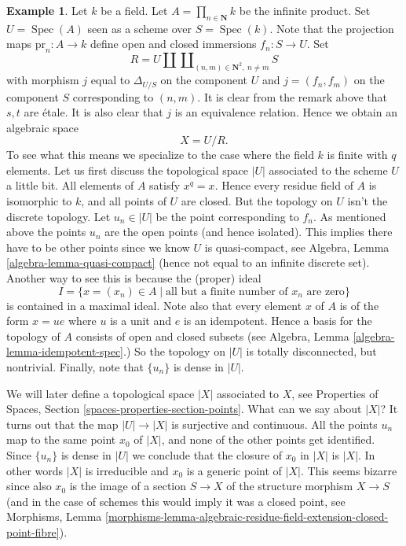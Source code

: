 \documentclass{stacks-project}
\theoremstyle{plain}
\theoremstyle{definition}
\newtheorem{example}[subsection]{Example}
\theoremstyle{remark}
\numberwithin{equation}{subsection}
\def\Spec{\mathop{\mathrm{Spec}}}
\begin{document}
\begin{example}
\label{example-infinite-product}
Let $k$ be a field.
Let $A = \prod_{n \in \mathbf{N}} k$ be the infinite product.
Set $U = \Spec(A)$ seen as a scheme over $S = \Spec(k)$.
Note that the projection maps $\text{pr}_n : A \to k$ define open
and closed immersions $f_n : S \to U$. Set
$$
R = U \amalg \coprod\nolimits_{(n, m) \in \mathbf{N}^2, \ n \not = m} S
$$
with morphism $j$ equal to $\Delta_{U/S}$ on the component $U$
and $j = (f_n, f_m)$ on the component $S$ corresponding to $(n, m)$.
It is clear from the remark above that $s, t$ are \'etale.
It is also clear that $j$ is an equivalence relation. Hence we
obtain an algebraic space
$$
X = U/R.
$$
To see what this means we specialize to the case where
the field $k$ is finite with $q$ elements. Let us first
discuss the topological space $|U|$ associated to the scheme $U$
a little bit. All elements of $A$ satisfy $x^q = x$.
Hence every residue field of $A$ is isomorphic to $k$, and
all points of $U$ are closed. But the topology on $U$ isn't
the discrete topology. Let $u_n \in |U|$ be the point corresponding
to $f_n$. As mentioned above the points $u_n$ are
the open points (and hence isolated). This implies there have
to be other points since we know $U$ is quasi-compact, see
Algebra, Lemma \ref{algebra-lemma-quasi-compact}
(hence not equal to an infinite discrete set).
Another way to see this is because the (proper) ideal
$$
I =
\{x = (x_n) \in A \mid \text{all but a finite number of }x_n\text{ are zero}\}
$$
is contained in a maximal ideal. Note also that every element
$x$ of $A$ is of the form $x = ue$ where $u$ is a unit and $e$ is an
idempotent. Hence a basis for the topology of $A$ consists of open and
closed subsets (see Algebra, Lemma \ref{algebra-lemma-idempotent-spec}.)
So the topology on $|U|$ is totally disconnected, but nontrivial.
Finally, note that $\{u_n\}$ is dense in $|U|$.

\medskip\noindent
We will later define a topological space $|X|$ associated to $X$, see
Properties of Spaces, Section \ref{spaces-properties-section-points}.
What can we say about $|X|$?
It turns out that the map $|U| \to |X|$ is surjective and continuous.
All the points $u_n$ map to the same point $x_0$ of $|X|$, and none of
the other points get identified. Since $\{u_n\}$ is dense in $|U|$ we
conclude that the closure of $x_0$ in $|X|$ is $|X|$. In other words
$|X|$ is irreducible and $x_0$ is a generic point of $|X|$. This seems
bizarre since also $x_0$ is the image of a section
$S \to X$ of the structure morphism $X \to S$ (and in the case of
schemes this would imply it was a closed point, see
Morphisms, Lemma
\ref{morphisms-lemma-algebraic-residue-field-extension-closed-point-fibre}).
\end{example}
\end{document}
